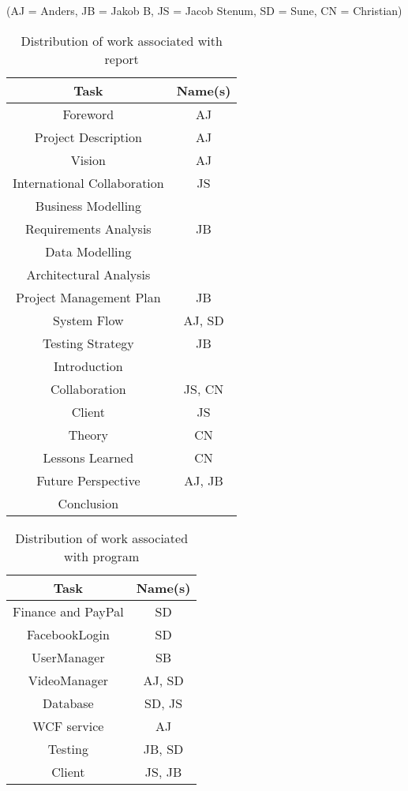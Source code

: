 \label{Distribution of Work}
(AJ = Anders, JB = Jakob B, JS = Jacob Stenum, SD = Sune, CN = Christian)\\
\begin{table}[H]
\caption{Distribution of work associated with report}
\centering

\begin{tabular}{c c}
Task & Name(s) \\ [1.5ex] 
\hline
Foreword & AJ \\
Project Description & AJ \\
Vision & AJ\\
International Collaboration & JS \\
Business Modelling & \\
Requirements Analysis & JB\\
Data Modelling & \\
Architectural Analysis & \\
Project Management Plan & JB \\
System Flow & AJ, SD\\
Testing Strategy & JB\\
Introduction & \\
Collaboration & JS, CN \\
Client & JS \\
Theory & CN \\
Lessons Learned & CN\\
Future Perspective & AJ, JB \\
Conclusion & \\

\end{tabular}
\end{table}
\newpage
\begin{table}[H]
\caption{Distribution of work associated with program}
\centering
\begin{tabular}{c c}
Task & Name(s)\\ [1.5ex] 
\hline
Finance and PayPal & SD \\
FacebookLogin & SD \\
UserManager & SB \\
VideoManager & AJ, SD \\
Database & SD, JS \\
WCF service & AJ\\
Testing & JB, SD \\
Client & JS, JB\\


\end{tabular}
\end{table}

